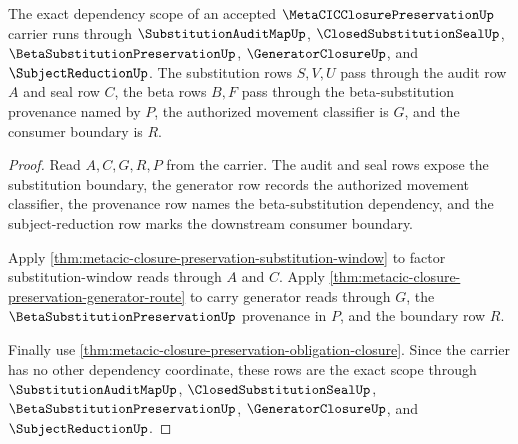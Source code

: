 \begin{theorem}
\label{thm:metacic-closure-preservation-scope-rows}
The exact dependency scope of an accepted $\MetaCICClosurePreservationUp$ carrier runs through $\SubstitutionAuditMapUp$, $\ClosedSubstitutionSealUp$, $\BetaSubstitutionPreservationUp$, $\GeneratorClosureUp$, and $\SubjectReductionUp$. The substitution rows $S,V,U$ pass through the audit row $A$ and seal row $C$, the beta rows $B,F$ pass through the beta-substitution provenance named by $P$, the authorized movement classifier is $G$, and the consumer boundary is $R$.
\end{theorem}
\begin{proof}
Read $A,C,G,R,P$ from the carrier. The audit and seal rows expose the substitution boundary, the generator row records the authorized movement classifier, the provenance row names the beta-substitution dependency, and the subject-reduction row marks the downstream consumer boundary.

Apply \autoref{thm:metacic-closure-preservation-substitution-window} to factor substitution-window reads through $A$ and $C$. Apply \autoref{thm:metacic-closure-preservation-generator-route} to carry generator reads through $G$, the $\BetaSubstitutionPreservationUp$ provenance in $P$, and the boundary row $R$.

Finally use \autoref{thm:metacic-closure-preservation-obligation-closure}. Since the carrier has no other dependency coordinate, these rows are the exact scope through $\SubstitutionAuditMapUp$, $\ClosedSubstitutionSealUp$, $\BetaSubstitutionPreservationUp$, $\GeneratorClosureUp$, and $\SubjectReductionUp$.
\end{proof}

